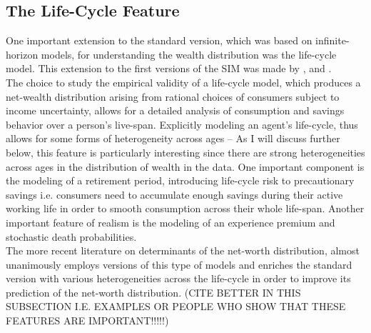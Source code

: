 \documentclass[a4paper,12pt]{article}
\begin{document}
\subsection{The Life-Cycle Feature}
One important extension to the standard version, which was based on infinite-horizon models, for understanding the wealth distribution was the life-cycle model. This extension to the first versions of the SIM was made by \cite{imrohoroglu1995life}, \cite{rios1995models} and \cite{huggett1996wealth}. \\
The choice to study the empirical validity of a life-cycle model, which produces a net-wealth distribution arising from rational choices of consumers subject to income uncertainty, allows for a detailed analysis of consumption and savings behavior over a person's live-span. 
Explicitly modeling an agent's life-cycle, thus allows for some forms of heterogeneity across ages \--- As I will discuss further below, this feature is particularly interesting since there are strong heterogeneities across ages in the distribution of wealth in the data. One important component is the modeling of a retirement period, introducing life-cycle risk to precautionary savings i.e. consumers need to accumulate enough savings during their active working life in order to smooth consumption across their whole life-span. Another important feature of realism is the modeling of an experience premium and stochastic death probabilities.\\
The more recent literature on determinants of the net-worth distribution, almost unanimously employs versions of this type of models and enriches the standard version with various heterogeneities across the life-cycle in order to improve its prediction of the net-worth distribution. (CITE BETTER IN THIS SUBSECTION I.E. EXAMPLES OR PEOPLE WHO SHOW THAT THESE FEATURES ARE IMPORTANT!!!!!) 
\end{document}
